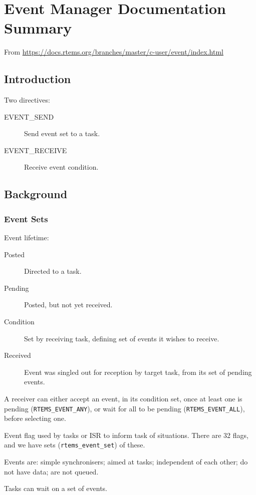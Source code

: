 \chapter{Event Manager Documentation Summary}

From
\url{https://docs.rtems.org/branches/master/c-user/event/index.html}

\section{Introduction}

Two directives:
\begin{description}
  \item [EVENT\_SEND] Send event set to a task.
  \item [EVENT\_RECEIVE] Receive event condition.
\end{description}

\section{Background}

\subsection{Event Sets}

Event lifetime:
\begin{description}
  \item [Posted] Directed to a task.
  \item [Pending] Posted, but not yet received.
  \item [Condition] Set by receiving task,
     defining set of events it wishes to receive.
  \item [Received] Event was singled out for reception by target task,
    from its set of pending events.
\end{description}
A receiver can either accept an event,
in its condition set,
 once at least one is pending (\texttt{RTEMS\_EVENT\_ANY}),
or wait for all to be pending (\texttt{RTEMS\_EVENT\_ALL}),
before selecting one.


Event flag used by tasks or ISR to inform task of situations.
There are 32 flags, and we have sets (\texttt{rtems\_event\_set}) of these.

Events are:
simple synchronisers;
aimed at tasks;
independent of each other;
do not have data;
are not queued.

Tasks can wait on a set of events.

